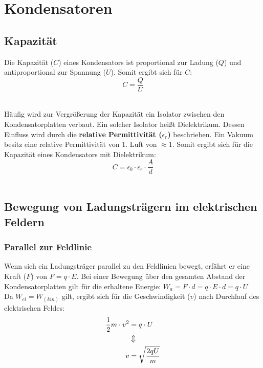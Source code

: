 \documentclass[a4paper]{article}
\begin{document}
\section{Kondensatoren}
\subsection{Kapazität}

Die Kapazität ($C$) eines Kondensators ist proportional zur Ladung ($Q$) und antiproportional zur Spannung ($U$).
Somit ergibt sich für $C$:
\Large$$C = \dfrac{Q}{U}$$\\ \normalsize

Häufig wird zur Vergrößerung der Kapazität ein Isolator zwischen den Kondensatorplatten verbaut. Ein solcher Isolator
heißt Dielektrikum. Dessen Einfluss wird durch die \textbf{relative Permittivität ($\epsilon_r$)} beschrieben. Ein Vakuum besitz eine
relative Permittivität von $1$. Luft von $\approx 1$. Somit ergibt sich für die Kapazität eines Kondensators mit
Dielektrikum:\\
\Large$$C = \epsilon_0 \cdot \epsilon_r \cdot \dfrac{A}{d}$$\\ \normalsize



\subsection{Bewegung von Ladungsträgern im elektrischen Feldern}
\subsubsection{Parallel zur Feldlinie}

Wenn sich ein Ladungsträger parallel zu den Feldlinien bewegt, erfährt er eine Kraft ($F$) von $F = q \cdot E$.
Bei einer Bewegung über den gesamten Abstand der Kondensatorplatten gilt für die erhaltene Energie:
$W_a = F \cdot d = q \cdot E \cdot d = q \cdot U$\\
Da $W_{el} = W_(kin)$ gilt, ergibt sich für die Geschwindigkeit ($v$) nach Durchlauf des elektrischen
Feldes:\\
\begin{align*}
	\small \frac{1}{2}m \cdot v^2 &= q \cdot U\\
	 &\Updownarrow\\
	\Large v &= \sqrt{\dfrac{2qU}{m}}\\ \normalsize
\end{align*}
\end{document}
